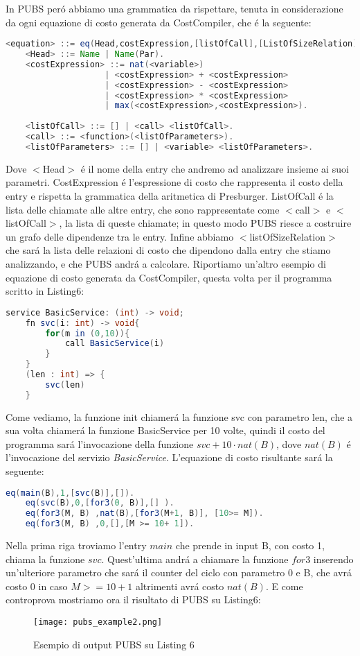 \documentclass[../../main.tex]{subfiles}
\begin{document}
In PUBS peró abbiamo una grammatica da rispettare, tenuta in considerazione da ogni equazione di costo generata da CostCompiler, che é la seguente:
\begin{lstlisting}[language=Java, caption={Grammatica PUBS}]
    <equation> ::= eq(Head,costExpression,[listOfCall],[ListOfSizeRelation]).
    <Head> ::= Name | Name(Par).
    <costExpression> ::= nat(<variable>) 
                    | <costExpression> + <costExpression> 
                    | <costExpression> - <costExpression> 
                    | <costExpression> * <costExpression> 
                    | max(<costExpression>,<costExpression>).
                    
    <listOfCall> ::= [] | <call> <listOfCall>.
    <call> ::= <function>(<listOfParameters>).
    <listOfParameters> ::= [] | <variable> <listOfParameters>.
\end{lstlisting}
Dove $<$Head$>$ é il nome della entry che andremo ad analizzare insieme ai suoi parametri.
CostExpression é l'espressione di costo che rappresenta il costo della entry e rispetta la grammatica della aritmetica di Presburger.
ListOfCall é la lista delle chiamate alle altre entry, che sono rappresentate come $<$call$>$ e $<$listOfCall$>$, la lista di queste chiamate; in questo modo PUBS riesce a costruire un grafo delle dipendenze tra le entry.
Infine abbiamo $<$listOfSizeRelation$>$ che sará la lista delle relazioni di costo che dipendono dalla entry che stiamo analizzando, e che PUBS andrá a calcolare.
Riportiamo un'altro esempio di equazione di costo generata da CostCompiler, questa volta per il programma scritto in Listing6:
\begin{lstlisting}[caption={Listing 6}, language=Java]
    service BasicService: (int) -> void;
    fn svc(i: int) -> void{
        for(m in (0,10)){
            call BasicService(i)
        }
    }
    (len : int) => {
        svc(len)
    }
\end{lstlisting}
Come vediamo, la funzione init chiamerá la funzione svc con parametro len, che a sua volta chiamerá la funzione BasicService per 10 volte, quindi il costo del programma sará l'invocazione della funzione $svc + 10 \cdot nat(B)$, dove $nat(B)$ é l'invocazione del servizio \textit{BasicService}.
L'equazione di costo risultante sará la seguente:
\begin{lstlisting}[language=Java,caption={Equazione di costo PUBS per Listing6}]
    eq(main(B),1,[svc(B)],[]).
    eq(svc(B),0,[for3(0, B)],[] ).
    eq(for3(M, B) ,nat(B),[for3(M+1, B)], [10>= M]).
    eq(for3(M, B) ,0,[],[M >= 10+ 1]).
\end{lstlisting}

Nella prima riga troviamo l'entry $main$ che prende in input B, con costo 1, chiama la funzione $svc$.
Quest'ultima andrá a chiamare la funzione $for3$ inserendo un'ulteriore parametro che sará il counter del ciclo con parametro 0 e B, che avrá costo 0 in caso $M >= 10 + 1$ altrimenti avrá costo $nat(B)$.
E come controprova mostriamo ora il risultato di PUBS su Listing6:
\begin{figure}[H]
    \centering
    \texttt{[image: pubs\_example2.png]}
    \caption{Esempio di output PUBS su Listing 6}
\end{figure}
\end{document}
